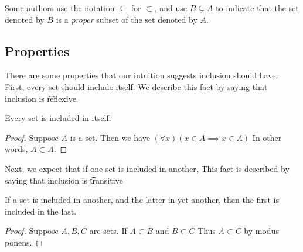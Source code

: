 Some authors use the notation $\subseteq$ for $\subset$, and use $B \subsetneq A$ to indicate that the set denoted by $B$ is a \textit{proper} subset of the set denoted by $A$.

\subsection*{Properties}


There are some properties that our intuition suggests inclusion should have.
First, every set should include itself.
We describe this fact by saying that inclusion is \t{reflexive}.
\begin{proposition}[Reflexive]
Every set is included in itself.
\end{proposition}

\begin{proof}Suppose $A$ is a set.
Then we have $(\forall x)(x \in A \implies x \in A)$
In other words, $A \subset A$.\end{proof}
%  


Next, we expect that if one set is included in another,
This fact is described by saying that inclusion is \t{transitive}
\begin{proposition}[Transitive]
If a set is included in another, and the latter in yet another, then the first is included in the last.
\end{proposition}

\begin{proof}Suppose $A, B, C$ are sets.
If $A \subset B$ and $B \subset C$
Thus $A \subset C$ by modus ponens.\end{proof}
%  

